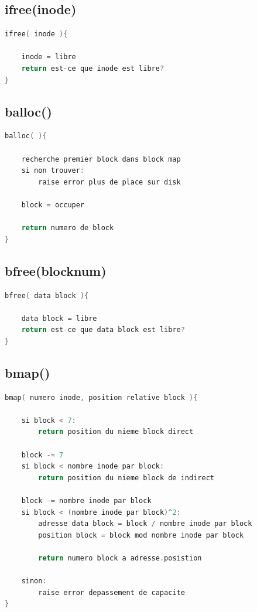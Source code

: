 \documentclass[a4paper,12pt]{article}
\begin{document}
\subsection{ifree(inode)}

\begin{lstlisting}[language=C, caption=pseudo code ifree()()]
ifree( inode ){

	inode = libre
	return est-ce que inode est libre?
}
\end{lstlisting}

\subsection{balloc()}

\begin{lstlisting}[language=C, caption=pseudo code balloc()()]
balloc( ){

	recherche premier block dans block map
	si non trouver:
		raise error plus de place sur disk
	
	block = occuper

	return numero de block
}
\end{lstlisting}

\subsection{bfree(blocknum)}

\begin{lstlisting}[language=C, caption=pseudo code bfree()()]
bfree( data block ){

	data block = libre
	return est-ce que data block est libre?
}
\end{lstlisting}

\subsection{bmap()}

\begin{lstlisting}[language=C, caption=pseudo code bmap()()]
bmap( numero inode, position relative block ){

	si block < 7:
		return position du nieme block direct
		
	block -= 7
	si block < nombre inode par block:
		return position du nieme block de indirect
	
	block -= nombre inode par block
	si block < (nombre inode par block)^2:
		adresse	data block = block / nombre inode par block
		position block = block mod nombre inode par block
		
		return numero block a adresse.posistion
		
	sinon:
		raise error depassement de capacite
}
\end{lstlisting}
\end{document}
